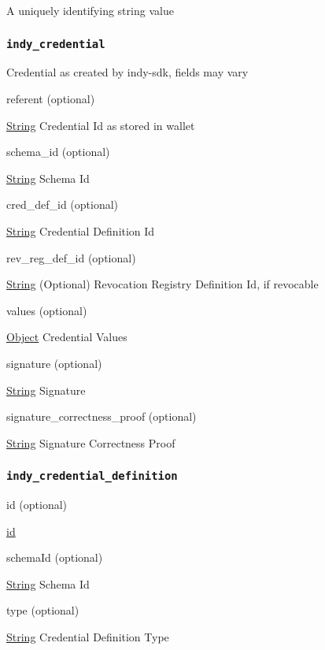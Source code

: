 A uniquely identifying string value

\hypertarget{indy_credential}{%
\subsubsection{\texorpdfstring{\protect\hypertarget{indy_credential}{}{\texttt{indy\_credential}}}{indy\_credential}}\label{indy_credential}}

Credential as created by indy-sdk, fields may vary

referent (optional)

{\protect\hyperlink{string}{String}} Credential Id as stored in wallet

schema\_id (optional)

{\protect\hyperlink{string}{String}} Schema Id

cred\_def\_id (optional)

{\protect\hyperlink{string}{String}} Credential Definition Id

rev\_reg\_def\_id (optional)

{\protect\hyperlink{string}{String}} (Optional) Revocation Registry
Definition Id, if revocable

values (optional)

{\protect\hyperlink{object}{Object}} Credential Values

signature (optional)

{\protect\hyperlink{string}{String}} Signature

signature\_correctness\_proof (optional)

{\protect\hyperlink{string}{String}} Signature Correctness Proof

\hypertarget{indy_credential_definition}{%
\subsubsection{\texorpdfstring{\protect\hypertarget{indy_credential_definition}{}{\texttt{indy\_credential\_definition}}}{indy\_credential\_definition}}\label{indy_credential_definition}}

id (optional)

{\protect\hyperlink{id}{id}}

schemaId (optional)

{\protect\hyperlink{string}{String}} Schema Id

type (optional)

{\protect\hyperlink{string}{String}} Credential Definition Type

